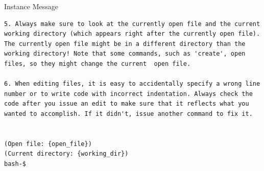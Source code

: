 {\begin{fileviewerbox}{Instance Message}
\begin{Verbatim}[breaklines=true]
5. Always make sure to look at the currently open file and the current working directory (which appears right after the currently open file). The currently open file might be in a different directory than the working directory! Note that some commands, such as 'create', open files, so they might change the current  open file.

6. When editing files, it is easy to accidentally specify a wrong line number or to write code with incorrect indentation. Always check the code after you issue an edit to make sure that it reflects what you wanted to accomplish. If it didn't, issue another command to fix it.
 

(Open file: {open_file})
(Current directory: {working_dir})
bash-$
\end{Verbatim}
\end{fileviewerbox}
\captionsetup{type=figure}
\label{fig.prompts.instance}
}